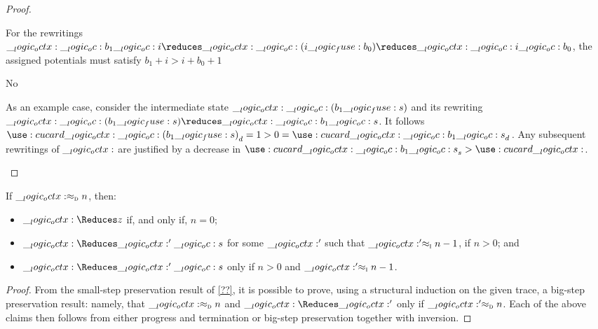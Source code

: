 \begin{proof}
\begin{description}
    For the rewritings $\octx \oc b_1 \oc i \reduces \octx \oc (i \fuse b_0) \reduces \octx \oc i \oc b_0$, the assigned potentials must satisfy $b_1 + i > i + b_0 + 1$


    No 

        



    As an example case, consider the intermediate state $\__logic_octx: \__logic_oc: (b_1 \__logic_fuse: s)$ and its rewriting $\octx \oc (b_1 \fuse s) \reduces \octx \oc b_1 \oc s$.
    It follows $\card{\octx \oc (b_1 \fuse s)}_d = 1 > 0 = \card{\octx \oc b_1 \oc s}_d$.
    Any subsequent rewritings of $\__logic_octx:$ are justified by a decrease in $\card{\octx \oc b_1 \oc s}_s > \card{\octx}$.
  \end{description}
\end{proof}

\begin{corollary}
  If $\__logic_octx: \approx\sb{\text{\normalfont\scshape d}} n$, then:
  \begin{itemize}[nosep]
  \item $\octx \Reduces z$ if, and only if, $n = 0$;
  \item $\octx \Reduces \octx' \oc s$ for some $\__logic_octx:'$ such that $\__logic_octx:' \approx\sb{\text{\normalfont\scshape i}} n-1$, if $n > 0$; and
  \item $\octx \Reduces \octx' \oc s$ only if $n > 0$ and $\__logic_octx:' \approx\sb{\text{\normalfont\scshape i}} n-1$.
  \end{itemize}
\end{corollary}
\begin{proof}
  From the small-step preservation result of \cref{??}, it is possible to prove, using a structural induction on the given trace, a big-step preservation result: namely, that $\__logic_octx: \approx\sb{\text{\normalfont\scshape d}} n$ and $\octx \Reduces \octx'$ only if $\__logic_octx:' \approx\sb{\text{\normalfont\scshape d}} n$.
  Each of the above claims then follows from either progress and termination or big-step preservation together with inversion.
\end{proof}

